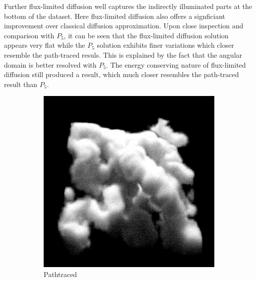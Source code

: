 Further flux-limited diffusion well captures the indirectly illuminated parts at the bottom of the dataset. Here flux-limited diffusion also offers a signficiant improvement over classical diffusion approximation. Upon close inspection and comparison with $P_5$, it can be seen that the flux-limited diffusion solution appears very flat while the $P_5$ solution exhibits finer variations which closer resemble the path-traced resuls. This is explained by the fact that the angular domain is better resolved with $P_5$. The energy conserving nature of flux-limited diffusion still produced a result, which much closer resembles the path-traced result than $P_5$.

\begin{figure}[h]
\centering
\begin{subfigure}[t]{0.48\columnwidth}
\includegraphics[width=\columnwidth]{06_fld/results/nebulae_ms_groundtruth.png}
\caption{Pathtraced}
\label{fig:fld_results_nebulae_1}
\end{subfigure}
\hspace{0.01\columnwidth}
\begin{subfigure}[t]{0.48\columnwidth}

\end{subfigure}
\end{figure}
